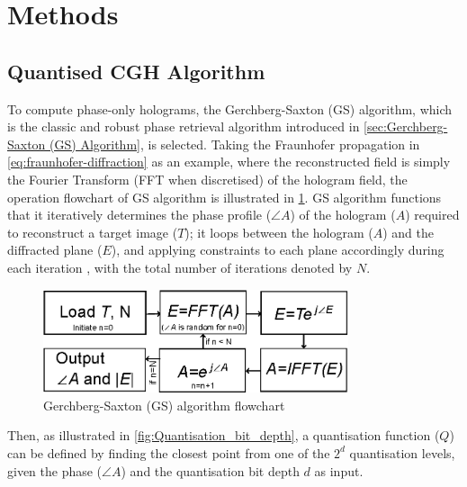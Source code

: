 \section{Methods}

\subsection{Quantised CGH Algorithm}
	To compute phase-only holograms, the Gerchberg-Saxton (GS) \cite{Gerchberg1972} algorithm, which is the classic and robust phase retrieval algorithm introduced in \cref{sec:Gerchberg-Saxton (GS) Algorithm}, is selected. Taking the Fraunhofer propagation in \cref{eq:fraunhofer-diffraction} as an example, where the reconstructed field is simply the Fourier Transform (FFT when discretised) of the hologram field, the operation flowchart of GS algorithm is illustrated in \cref{fig:GS_flowchart}. GS algorithm functions that it iteratively determines the phase profile ($\angle A$) of the hologram ($A$) required to reconstruct a target image ($T$); it loops between the hologram ($A$) and the diffracted plane ($E$), and applying constraints to each plane accordingly during each iteration \cite{Gerchberg1972}, with the total number of iterations denoted by $N$.

	\begin{figure} [H]
	   \begin{center}
	   \includegraphics[width = 0.8\textwidth]{GS_flowchart.eps}
	   \end{center}
	   \caption{\label{fig:GS_flowchart} Gerchberg-Saxton (GS) algorithm flowchart}
	\end{figure}

	Then, as illustrated in \cref{fig:Quantisation_bit_depth}, a quantisation function ($Q$) can be defined by finding the closest point from one of the $2^d$ quantisation levels, given the phase ($\angle A$) and the quantisation bit depth $d$ as input.

